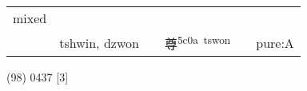 \documentclass[14pt,a4paper]{scrartcl}
\begin{document}
\begin{longtable}[c]{@{}llllll@{}}
\begin{minipage}[t]{0.14\columnwidth}
mixed
\strut\end{minipage}\tabularnewline
\begin{minipage}[t]{0.14\columnwidth}\raggedright\strut
𢍜
\strut\end{minipage} &
\begin{minipage}[t]{0.14\columnwidth}\raggedright\strut
tshwin, dzwon
\strut\end{minipage} &
\begin{minipage}[t]{0.14\columnwidth}\raggedright\strut
\strut\end{minipage} &
\begin{minipage}[t]{0.14\columnwidth}\raggedright\strut
尊\textsuperscript{5c0a~tswon}
\strut\end{minipage} &
\begin{minipage}[t]{0.14\columnwidth}\raggedright\strut
\strut\end{minipage} &
\begin{minipage}[t]{0.14\columnwidth}\raggedright\strut
pure:A
\strut\end{minipage}\tabularnewline
\bottomrule
\end{longtable}

(98) 0437 {[}3{]}
\end{document}
